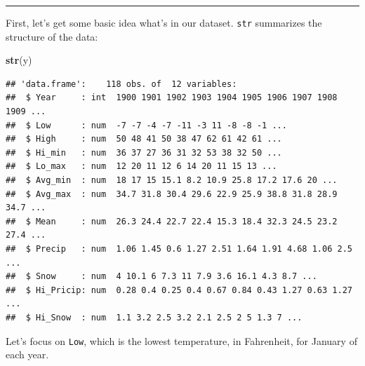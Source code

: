 \documentclass[]{article}
\newenvironment{Shaded}{\begin{snugshade}}{\end{snugshade}}
\newcommand{\KeywordTok}[1]{\textcolor[rgb]{0.13,0.29,0.53}{\textbf{#1}}}
\newcommand{\NormalTok}[1]{#1}
\begin{document}
\begin{center}\rule{0.5\linewidth}{\linethickness}\end{center}

First, let's get some basic idea what's in our dataset. \texttt{str}
summarizes the structure of the data:

\begin{Shaded}
\begin{Highlighting}[]
\KeywordTok{str}\NormalTok{(y)}
\end{Highlighting}
\end{Shaded}

\begin{verbatim}
## 'data.frame':    118 obs. of  12 variables:
##  $ Year     : int  1900 1901 1902 1903 1904 1905 1906 1907 1908 1909 ...
##  $ Low      : num  -7 -7 -4 -7 -11 -3 11 -8 -8 -1 ...
##  $ High     : num  50 48 41 50 38 47 62 61 42 61 ...
##  $ Hi_min   : num  36 37 27 36 31 32 53 38 32 50 ...
##  $ Lo_max   : num  12 20 11 12 6 14 20 11 15 13 ...
##  $ Avg_min  : num  18 17 15 15.1 8.2 10.9 25.8 17.2 17.6 20 ...
##  $ Avg_max  : num  34.7 31.8 30.4 29.6 22.9 25.9 38.8 31.8 28.9 34.7 ...
##  $ Mean     : num  26.3 24.4 22.7 22.4 15.3 18.4 32.3 24.5 23.2 27.4 ...
##  $ Precip   : num  1.06 1.45 0.6 1.27 2.51 1.64 1.91 4.68 1.06 2.5 ...
##  $ Snow     : num  4 10.1 6 7.3 11 7.9 3.6 16.1 4.3 8.7 ...
##  $ Hi_Pricip: num  0.28 0.4 0.25 0.4 0.67 0.84 0.43 1.27 0.63 1.27 ...
##  $ Hi_Snow  : num  1.1 3.2 2.5 3.2 2.1 2.5 2 5 1.3 7 ...
\end{verbatim}

Let's focus on \texttt{Low}, which is the lowest temperature, in
Fahrenheit, for January of each year.
\end{document}
